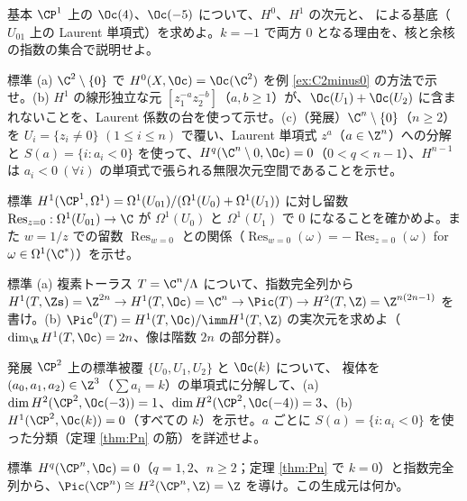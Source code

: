 \begin{prob}{基本}\label{p:P1dims}
$\CP^1$ 上の $\Oc(4)$、$\Oc(-5)$ について、$H^0$、$H^1$ の次元と、\Cech{} による基底（$U_{01}$ 上の Laurent 単項式）を求めよ。$k=-1$ で両方 $0$ となる理由を、核と余核の指数の集合で説明せよ。
\end{prob}
\begin{prob}{標準}\label{p:C2}
(a) $\C^2\setminus\{0\}$ で $H^0(X,\Oc)=\Oc(\C^2)$ を例 \ref{ex:C2minus0} の方法で示せ。(b) $H^1$ の線形独立な元 $[z_1^{-a}z_2^{-b}]$（$a,b\ge1$）が、$\Oc(U_1)+\Oc(U_2)$ に含まれないことを、Laurent 係数の台を使って示せ。(c)（発展）$\C^n\setminus\{0\}$（$n\ge2$）を $U_i=\{z_i\ne0\}$ $(1\le i\le n)$ で覆い、Laurent 単項式 $z^a$（$a\in\Z^n$）への分解と $S(a)=\{i:a_i<0\}$ を使って、$H^q(\C^n\setminus0,\Oc)=0$（$0<q<n-1$）、$H^{n-1}$ は $a_i<0\ (\forall i)$ の単項式で張られる無限次元空間であることを示せ。
\end{prob}
\begin{prob}{標準}\label{p:residue}
$H^1(\CP^1,\Omega^1)=\Omega^1(U_{01})/(\Omega^1(U_0)+\Omega^1(U_1))$ に対し留数 $\operatorname{Res}_{z=0}:\Omega^1(U_{01})\to\C$ が $\Omega^1(U_0)$ と $\Omega^1(U_1)$ で $0$ になることを確かめよ。また $w=1/z$ での留数 $\operatorname{Res}_{w=0}$ との関係（$\operatorname{Res}_{w=0}(\omega)=-\operatorname{Res}_{z=0}(\omega)$ for $\omega\in\Omega^1(\C^*)$）を示せ。
\end{prob}
\begin{prob}{標準}\label{p:PicTorus}
(a) 複素トーラス $T=\C^n/\Lambda$ について、指数完全列から $H^1(T,\Zs)=\Z^{2n}\to H^1(T,\Oc)=\C^n\to\Pic(T)\to H^2(T,\Z)=\Z^{n(2n-1)}$ を書け。(b) $\Pic^0(T)=H^1(T,\Oc)/\imm H^1(T,\Z)$ の実次元を求めよ（$\dim_\R H^1(T,\Oc)=2n$、像は階数 $2n$ の部分群）。
\end{prob}
\begin{prob}{発展}\label{p:Pnh}
$\CP^2$ 上の標準被覆 $\{U_0,U_1,U_2\}$ と $\Oc(k)$ について、\Cech{} 複体を $(a_0,a_1,a_2)\in\Z^3$（$\sum a_i=k$）の単項式に分解して、(a) $\dim H^2(\CP^2,\Oc(-3))=1$、$\dim H^2(\CP^2,\Oc(-4))=3$、(b) $H^1(\CP^2,\Oc(k))=0$（すべての $k$）を示せ。$a$ ごとに $S(a)=\{i:a_i<0\}$ を使った分類（定理 \ref{thm:Pn} の筋）を詳述せよ。
\end{prob}
\begin{prob}{標準}\label{p:PicCPn}
$H^q(\CP^n,\Oc)=0$（$q=1,2$、$n\ge2$；定理 \ref{thm:Pn} で $k=0$）と指数完全列から、$\Pic(\CP^n)\cong H^2(\CP^n,\Z)=\Z$ を導け。この生成元は何か。
\end{prob}


